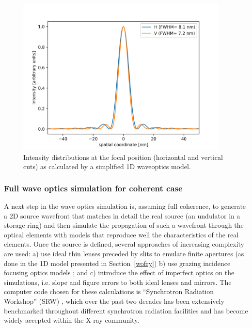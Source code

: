 \documentclass{iucr}              %
\begin{document}
\begin{figure}
\label{wofry1D}
\centering
\includegraphics[width=0.95\textwidth]{GRAPHICS/wofry1D.png}
\caption{Intensity distributions at the focal position (horizontal and vertical cuts) as calculated by a simplified 1D waveoptics model. 
}
\end{figure}


\subsubsection{Full wave optics simulation for coherent case}
\label{srw_se}

A next step in the wave optics simulation is, assuming full coherence, to generate a 2D source wavefront that matches in detail the real source (an undulator in a storage ring) and then simulate the propagation of such a wavefront through the optical elements with models that reproduce well the characteristics of the real elements. Once the source is defined, several approaches of increasing complexity are used: a) use ideal thin lenses preceded by slits to emulate finite apertures (as done in the 1D model presented in Section~\ref{wofry}) b) use grazing incidence focusing optics models \cite{Canestrari2014}; and c) introduce the effect of imperfect optics on the simulations, i.e. slope and figure errors to both ideal lenses and mirrors. The computer code chosen for these calculations is ``Synchrotron Radiation Workshop'' (SRW) \cite{codeSRW}, which over the past two decades has been extensively benchmarked throughout different synchrotron radiation facilities and has become widely accepted within the X-ray community. 
\end{document}
